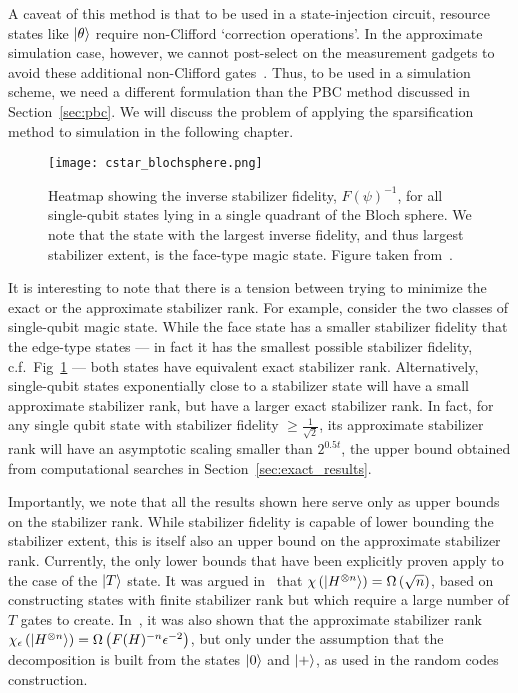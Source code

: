 A caveat of this method is that to be used in a state-injection circuit, resource states like $\ket{\theta}$ require non-Clifford `correction operations'. In the approximate simulation case, however, we cannot post-select on the measurement gadgets to avoid these additional non-Clifford gates~\cite{Bravyi2016}. Thus, to be used in a simulation scheme, we need a different formulation than the PBC method discussed in Section~\ref{sec:pbc}. We will discuss the problem of applying the sparsification method to simulation in the following chapter.\par
\begin{figure}[t]
\centering
\texttt{[image: cstar\_blochsphere.png]}
\caption{Heatmap showing the inverse stabilizer fidelity, $F(\psi)^{-1}$, for all single-qubit states lying in a single quadrant of the Bloch sphere. We note that the state with the largest inverse fidelity, and thus largest stabilizer extent, is the face-type magic state. Figure taken from~\cite{Bravyi2018}.}
\label{fig:fidelity_heatmap}
\end{figure}
It is interesting to note that there is a tension between trying to minimize the exact or the approximate stabilizer rank. For example, consider the two classes of single-qubit magic state. While the face state has a smaller stabilizer fidelity that the edge-type states ---  in fact it has the smallest possible stabilizer fidelity, c.f.\ Fig~\ref{fig:fidelity_heatmap} --- both states have equivalent exact stabilizer rank. Alternatively, single-qubit states exponentially close to a stabilizer state will have a small approximate stabilizer rank, but have a larger exact stabilizer rank. In fact, for any single qubit state with stabilizer fidelity $\geq\frac{1}{\sqrt{2}}$, its approximate stabilizer rank will have an asymptotic scaling smaller than $2^{0.5t}$, the upper bound obtained from computational searches in Section~\ref{sec:exact_results}.\par
Importantly, we note that all the results shown here serve only as upper bounds on the stabilizer rank. While stabilizer fidelity is capable of lower bounding the stabilizer extent, this is itself also an upper bound on the approximate stabilizer rank. Currently, the only lower bounds that have been explicitly proven apply to the case of the $\ket{T}$ state. It was argued in~\cite{Bravyi2015} that $\chi\left(\ket{H^{\otimes n}}\right)=\Omega\left(\sqrt{n}\right)$, based on constructing states with finite stabilizer rank but which require a large number of $T$ gates to create. In~\cite{Bravyi2018}, it was also shown that the approximate stabilizer rank $\chi_{\epsilon}\left(\ket{H^{\otimes n}}\right)=\Omega\left(F(H)^{-n}\epsilon^{-2}\right)$, but only under the assumption that the decomposition is built from the states $\ket{0}$ and $\ket{+}$, as used in the random codes construction.\par
